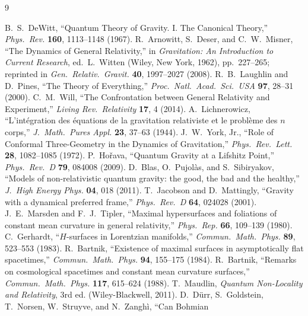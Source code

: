 \documentclass[11pt]{article}
\begin{document}
\begingroup\small
\begin{thebibliography}{9}
 B.~S.~DeWitt, ``Quantum Theory of Gravity. I. The Canonical Theory,''
  \emph{Phys.\ Rev.} \textbf{160}, 1113--1148 (1967).
 R.~Arnowitt, S.~Deser, and C.~W.~Misner, ``The Dynamics of General Relativity,'' in
  \emph{Gravitation: An Introduction to Current Research}, ed.\ L.~Witten (Wiley, New York, 1962),
  pp.~227--265; reprinted in \emph{Gen.\ Relativ.\ Gravit.} \textbf{40}, 1997--2027 (2008).
 R.~B.~Laughlin and D.~Pines, ``The Theory of Everything,''
  \emph{Proc.\ Natl.\ Acad.\ Sci.\ USA} \textbf{97}, 28--31 (2000).
 C.~M.~Will, ``The Confrontation between General Relativity and Experiment,''
  \emph{Living Rev.\ Relativity} \textbf{17}, 4 (2014).
 A.~Lichnerowicz, ``L'int\'egration des \'equations de la gravitation relativiste
  et le probl\`eme des $n$ corps,'' \emph{J.\ Math.\ Pures Appl.} \textbf{23}, 37--63 (1944).
 J.~W.~York, Jr., ``Role of Conformal Three-Geometry in the Dynamics of Gravitation,''
  \emph{Phys.\ Rev.\ Lett.} \textbf{28}, 1082--1085 (1972).
 P.~Ho\v{r}ava, ``Quantum Gravity at a Lifshitz Point,''
  \emph{Phys.\ Rev.\ D} \textbf{79}, 084008 (2009).
 D.~Blas, O.~Pujol\`as, and S.~Sibiryakov, ``Models of non-relativistic
  quantum gravity: the good, the bad and the healthy,'' \emph{J.\ High Energy Phys.} \textbf{04}, 018 (2011).
 T.~Jacobson and D.~Mattingly, ``Gravity with a dynamical preferred frame,''
  \emph{Phys.\ Rev.\ D} \textbf{64}, 024028 (2001).
 J.~E.~Marsden and F.~J.~Tipler, ``Maximal hypersurfaces and foliations of
  constant mean curvature in general relativity,'' \emph{Phys.\ Rep.} \textbf{66}, 109--139 (1980).
 C.~Gerhardt, ``$H$-surfaces in Lorentzian manifolds,''
  \emph{Commun.\ Math.\ Phys.} \textbf{89}, 523--553 (1983).
 R.~Bartnik, ``Existence of maximal surfaces in asymptotically flat spacetimes,''
  \emph{Commun.\ Math.\ Phys.} \textbf{94}, 155--175 (1984).
 R.~Bartnik, ``Remarks on cosmological spacetimes and constant mean curvature
  surfaces,'' \emph{Commun.\ Math.\ Phys.} \textbf{117}, 615--624 (1988).
 T.~Maudlin, \emph{Quantum Non-Locality and Relativity}, 3rd ed.
  (Wiley-Blackwell, 2011).
 D.~D\"urr, S.~Goldstein, T.~Norsen, W.~Struyve, and N.~Zangh\`i, ``Can Bohmian

\end{thebibliography}
\end{document}
